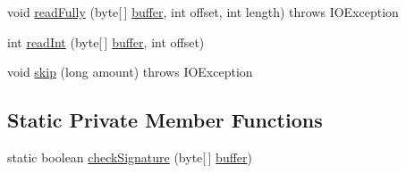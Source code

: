 \begin{DoxyCompactItemize}
\item 
void \mbox{\hyperlink{classorg_1_1newdawn_1_1slick_1_1opengl_1_1_p_n_g_decoder_ac1389015c67277f87b9f759e6095f2c0}{read\+Fully}} (byte\mbox{[}$\,$\mbox{]} \mbox{\hyperlink{classorg_1_1newdawn_1_1slick_1_1opengl_1_1_p_n_g_decoder_ae205f9222586a2bc01a8a240c5c210ad}{buffer}}, int offset, int length)  throws I\+O\+Exception 
\item 
int \mbox{\hyperlink{classorg_1_1newdawn_1_1slick_1_1opengl_1_1_p_n_g_decoder_a6a9d36165b993d86112b50b6d2026f63}{read\+Int}} (byte\mbox{[}$\,$\mbox{]} \mbox{\hyperlink{classorg_1_1newdawn_1_1slick_1_1opengl_1_1_p_n_g_decoder_ae205f9222586a2bc01a8a240c5c210ad}{buffer}}, int offset)
\item 
void \mbox{\hyperlink{classorg_1_1newdawn_1_1slick_1_1opengl_1_1_p_n_g_decoder_a40dd58180327dca560b33952f36a70c4}{skip}} (long amount)  throws I\+O\+Exception 
\end{DoxyCompactItemize}
\subsection*{Static Private Member Functions}
\begin{DoxyCompactItemize}
\item 
static boolean \mbox{\hyperlink{classorg_1_1newdawn_1_1slick_1_1opengl_1_1_p_n_g_decoder_a025dcd998650265f0d15edd6c68c049d}{check\+Signature}} (byte\mbox{[}$\,$\mbox{]} \mbox{\hyperlink{classorg_1_1newdawn_1_1slick_1_1opengl_1_1_p_n_g_decoder_ae205f9222586a2bc01a8a240c5c210ad}{buffer}})
\end{DoxyCompactItemize}
